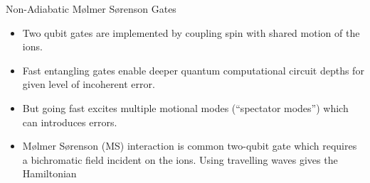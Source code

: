 \documentclass[final]{beamer}
\begin{document}
\begin{frame}{}
\begin{center}
\begin{columns}[t]
\begin{column}{0.49\textwidth}
    \begin{alertblock}{Non-Adiabatic Mølmer Sørenson Gates}
      \begin{minipage}{0.83\linewidth}
      \begin{itemize}
      \item Two qubit gates are implemented by coupling spin with shared motion of the ions.
      \item Fast entangling gates enable deeper quantum computational circuit depths for given level of incoherent error.
      \item But going fast excites multiple motional modes (``spectator modes'') which can introduces errors.
      \item Mølmer Sørenson (MS) interaction is common two-qubit gate which requires a
      bichromatic field incident on the ions. Using travelling
      waves gives the Hamiltonian
      \end{itemize}
      \end{minipage}
      \begin{minipage}{0.14\linewidth}
      \begin{figure}

\end{figure}
\end{minipage}
\end{alertblock}
\end{column}
\end{columns}
\end{center}
\end{frame}
\end{document}
